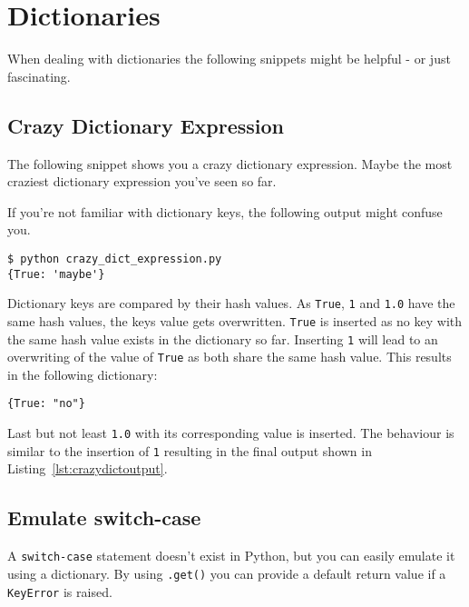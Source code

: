 
\section{Dictionaries}

When dealing with dictionaries the following snippets might be helpful - or just fascinating.


\subsection{Crazy Dictionary Expression}

The following snippet shows you a crazy dictionary expression.
Maybe the most craziest dictionary expression you've seen so far.



If you're not familiar with dictionary keys, the following output might confuse you.

\begin{lstlisting}[caption=Output of crazy\_dict\_expression.py,label=lst:crazydictoutput]
$ python crazy_dict_expression.py
{True: 'maybe'}
\end{lstlisting}

Dictionary keys are compared by their hash values.
As \lstinline{True}, \lstinline{1} and \lstinline{1.0} have the same hash values, the keys value gets overwritten.
\lstinline{True} is inserted as no key with the same hash value exists in the dictionary so far.
Inserting \lstinline{1} will lead to an overwriting of the value of \lstinline{True} as both share the same hash value.
This results in the following dictionary:

\begin{lstlisting}
{True: "no"}
\end{lstlisting}

Last but not least \lstinline{1.0} with its corresponding value is inserted.
The behaviour is similar to the insertion of \lstinline{1} resulting in the final output shown in Listing~\ref{lst:crazydictoutput}.


\subsection{Emulate switch-case}

A \lstinline{switch-case} statement doesn't exist in Python, but you can easily emulate it using a dictionary.
By using \mbox{\lstinline{.get()}} you can provide a default return value if a \lstinline{KeyError} is raised.


